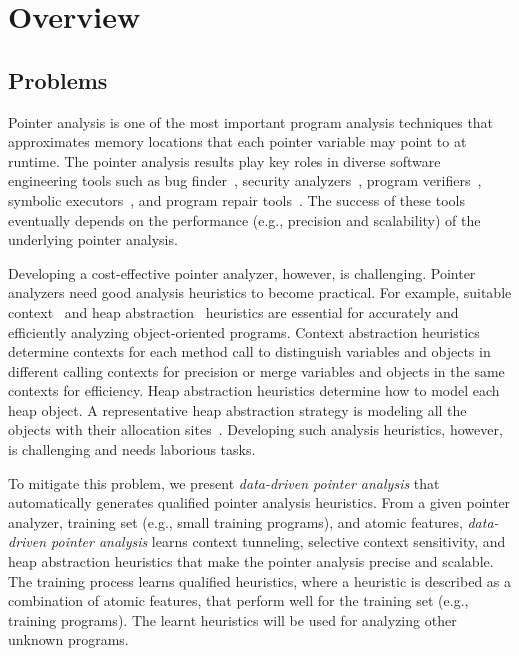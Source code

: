 \listoftodos
\chapter{Overview}
\section{Problems}
Pointer analysis is one of the most important program analysis techniques that approximates memory locations that each pointer variable may point to at runtime.
The pointer analysis results play key roles in diverse software engineering tools such as
bug finder~\cite{Naik2006,NaikPSG09,Blackshear2015,Sui2014,Livshits2003}, security analyzers~\cite{Avots2005,Arzt2014,Tripp2009,Yan2017,Grech17},
program verifiers~\cite{Fink2008}, symbolic executors~\cite{Kapus2019}, and program repair tools~\cite{memfix,Gao2015,vfix2019,saver2020}. 
The success of these tools eventually depends on the performance (e.g., precision and scalability) of the underlying pointer analysis.

Developing a cost-effective pointer analyzer, however, is challenging.
Pointer analyzers need good analysis heuristics to become practical. 
For example, suitable context~\cite{KastrinisS13a,Li2018b,Li2018a,Smaragdakis2014,Tan2020,Lu:2019:PYF,JeJeChOh17} and heap abstraction~\cite{Tan2017,TanLX16} heuristics are essential for accurately and efficiently analyzing object-oriented programs. 
Context abstraction heuristics determine contexts for each method call to distinguish variables and objects in different calling contexts for precision or merge variables and objects in the same contexts for efficiency. 
Heap abstraction heuristics determine how to model each heap object. A representative heap abstraction strategy is modeling all the objects with their allocation sites~\cite{Tan2017}.
Developing such analysis heuristics, however, is challenging and needs laborious tasks. 

To mitigate this problem, we present {\em data-driven pointer analysis} that automatically generates qualified pointer analysis heuristics.
From a given pointer analyzer, training set (e.g., small training programs), and atomic features, {\em data-driven pointer analysis} learns context tunneling, selective context sensitivity, and heap abstraction heuristics that make the pointer analysis precise and scalable.
The training process learns qualified heuristics, where a heuristic is described as a combination of atomic features, that perform well for the training set (e.g., training programs). The learnt heuristics will be used for analyzing other unknown programs.



